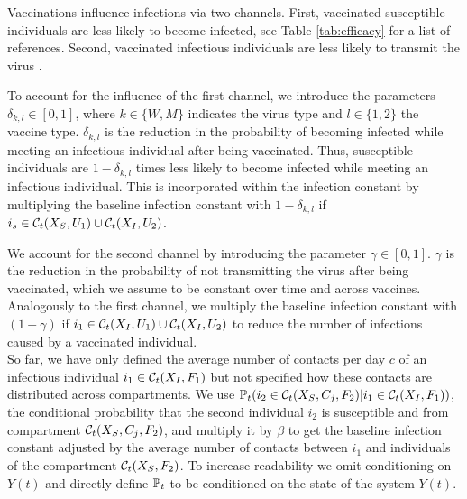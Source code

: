 Vaccinations influence infections via two channels. First, vaccinated susceptible individuals are less likely to become infected, see Table \ref{tab:efficacy} for a list of references. Second, vaccinated infectious individuals are less likely to transmit the virus \citep{Harris.2021}.

To account for the influence of the first channel, we introduce the parameters $\delta_{k,l} \in [0,1]$, where $k \in \{W, M\}$ indicates the virus type and $l \in \{ 1,2\}$ the vaccine type. $\delta_{k,l}$ is the reduction in the probability of becoming infected while meeting an infectious individual after being vaccinated. Thus, susceptible individuals are $1 - \delta_{k,l}$ times less likely to become infected while meeting an infectious individual. This is incorporated within the infection constant by multiplying the baseline infection constant with $1 - \delta_{k,l}$ if $i_s \in \mathcal{C}_t(X_S, U_1) \cup \mathcal{C}_t(X_I, U_2)$.

We account for the second channel by introducing the parameter $\gamma \in [0,1]$. $\gamma$ is the reduction in the probability of not transmitting the virus after being vaccinated, which we assume to be constant over time and across vaccines. Analogously to the first channel, we  multiply the baseline infection constant with $(1 - \gamma)$ if $i_1 \in \mathcal{C}_t(X_I, U_1) \cup \mathcal{C}_t(X_I, U_2)$ to reduce the number of infections caused by a vaccinated individual.  \\

So far, we have only defined the average number of contacts per day $c$ of an infectious individual $i_1 \in \mathcal{C}_t(X_I, F_1)$ but not specified how these contacts are distributed across compartments. We use $\mathbb{P}_t(i_2 \in \mathcal{C}_t(X_S, C_j, F_2) | i_1 \in \mathcal{C}_t(X_I, F_1))$, the conditional probability that the second individual $i_2$ is susceptible and from compartment $\mathcal{C}_t(X_S, C_j, F_2)$, and multiply it by $\beta$ to get the baseline infection constant adjusted by the average number of contacts between $i_1$ and individuals of the compartment $\mathcal{C}_t(X_S, F_2)$. To increase readability we omit conditioning on $Y(t)$ and directly define $\mathbb{P}_t$ to be conditioned on the state of the system $Y(t)$.

